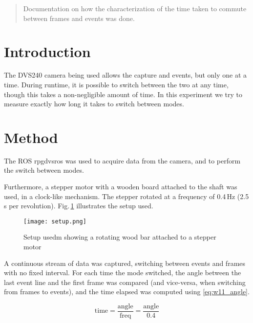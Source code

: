 \documentclass[10pt,twocolumn]{IEEEtran}
\begin{document}
\title{}
\author{Jose Pedro Gomes}

\maketitle

\begin{abstract}
    Documentation on how the characterization of the time taken to commute between frames and events was done.
\end{abstract}

\section{Introduction}

The DVS240 camera being used allows the capture and events, but only one at a time. During runtime, it is possible to switch between the two at any time, though this takes a non-negligible amount of time. In this experiment we try to measure exactly how long it takes to switch between modes.


\section{Method}

The ROS rpg\textunderscore dvs\textunderscore ros was used to acquire data from the camera, and to perform the switch between modes.

Furthermore, a stepper motor with a wooden board attached to the shaft was used, in a clock-like mechanism. The stepper rotated at a frequency of 0.4\,Hz (2.5\,s per revolution). Fig.\,\ref{fig:w11_setup} illustrates the setup used.

\begin{figure}[ht]
    \centering
    \texttt{[image: setup.png]}
    \caption{Setup usedm showing a rotating wood bar attached to a stepper motor}
    \label{fig:w11_setup}
\end{figure}

A continuous stream of data was captured, switching between events and frames with no fixed interval. For each time the mode switched, the angle between the last event line and the first frame was compared (and vice-versa, when switching from frames to events), and the time elapsed was computed using \eqref{eq:w11_angle}.

\begin{equation}
    \label{eq:w11_angle}
    \text{time} = \frac{\text{angle}}{\text{freq}} = \frac{\text{angle}}{0.4}
\end{equation}
\end{document}
